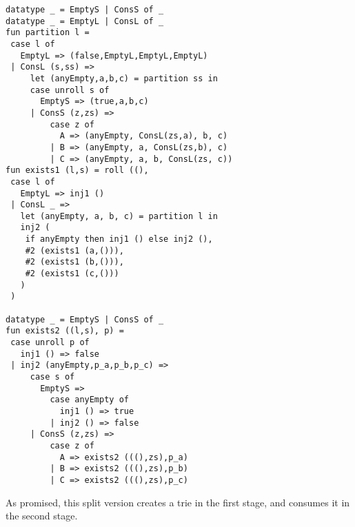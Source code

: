 \begin{lstlisting} 
datatype _ = EmptyS | ConsS of _
datatype _ = EmptyL | ConsL of _
fun partition l =
 case l of
   EmptyL => (false,EmptyL,EmptyL,EmptyL)
 | ConsL (s,ss) =>
     let (anyEmpty,a,b,c) = partition ss in
     case unroll s of
       EmptyS => (true,a,b,c)
     | ConsS (z,zs) =>
         case z of 
           A => (anyEmpty, ConsL(zs,a), b, c) 
         | B => (anyEmpty, a, ConsL(zs,b), c) 
         | C => (anyEmpty, a, b, ConsL(zs, c))
fun exists1 (l,s) = roll ((), 
 case l of 
   EmptyL => inj1 ()
 | ConsL _ => 
   let (anyEmpty, a, b, c) = partition l in
   inj2 (
   	if anyEmpty then inj1 () else inj2 (), 
   	#2 (exists1 (a,())), 
   	#2 (exists1 (b,())), 
   	#2 (exists1 (c,()))
   )
 )

datatype _ = EmptyS | ConsS of _
fun exists2 ((l,s), p) =
 case unroll p of 
   inj1 () => false
 | inj2 (anyEmpty,p_a,p_b,p_c) => 
     case s of
       EmptyS => 
         case anyEmpty of 
           inj1 () => true 
         | inj2 () => false
     | ConsS (z,zs) =>
         case z of
           A => exists2 (((),zs),p_a)
         | B => exists2 (((),zs),p_b)
         | C => exists2 (((),zs),p_c)
\end{lstlisting}

As promised, this split version creates a trie in the first stage, and consumes it in the second stage.